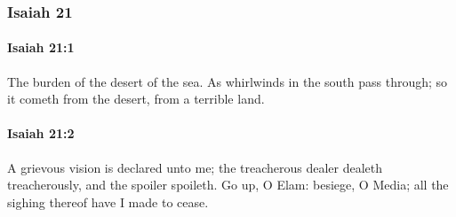 	\subsubsection{Isaiah 21} %
		\label{ISAIAH-21}

		\paragraph{Isaiah 21:1} %
			\label{ISAIAH-21-1}

			The burden of the desert of the sea. As whirlwinds in the south pass through; so it cometh from the desert, from a terrible land.


		\paragraph{Isaiah 21:2} %
			\label{ISAIAH-21-2}

			A grievous vision is declared unto me; the treacherous dealer dealeth treacherously, and the spoiler spoileth. Go up, O Elam: besiege, O Media; all the sighing thereof have I made to cease.

